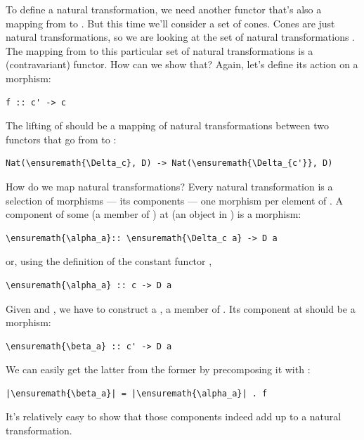 \noindent
To define a natural transformation, we need another functor that's also
a mapping from  to . But this time we'll consider a
set of cones. Cones are just natural transformations, so we are looking
at the set of natural transformations . The mapping
from  to this particular set of natural transformations is a
(contravariant) functor. How can we show that? Again, let's define its
action on a morphism:

\begin{Verbatim}[commandchars=\\\{\}]
f :: c' -> c
\end{Verbatim}
The lifting of  should be a mapping of natural transformations
between two functors that go from  to :

\begin{Verbatim}[commandchars=\\\{\}]
Nat(\ensuremath{\Delta_c}, D) -> Nat(\ensuremath{\Delta_{c'}}, D)
\end{Verbatim}
How do we map natural transformations? Every natural transformation is a
selection of morphisms --- its components --- one morphism per element
of . A component of some \mathtext{\alpha} (a member of ) at
 (an object in ) is a morphism:

\begin{Verbatim}[commandchars=\\\{\}]
\ensuremath{\alpha_a}:: \ensuremath{\Delta_c a} -> D a
\end{Verbatim}
or, using the definition of the constant functor \mathtext{\Delta},

\begin{Verbatim}[commandchars=\\\{\}]
\ensuremath{\alpha_a} :: c -> D a
\end{Verbatim}
Given  and \mathtext{\alpha}, we have to construct a \mathtext{\beta}, a member of
. Its component at  should be a
morphism:

\begin{Verbatim}[commandchars=\\\{\}]
\ensuremath{\beta_a} :: c' -> D a
\end{Verbatim}
We can easily get the latter from the former by precomposing it with
:

\begin{Verbatim}[commandchars=\\\{\}]
|\ensuremath{\beta_a}| = |\ensuremath{\alpha_a}| . f
\end{Verbatim}
It's relatively easy to show that those components indeed add up to a
natural transformation.

